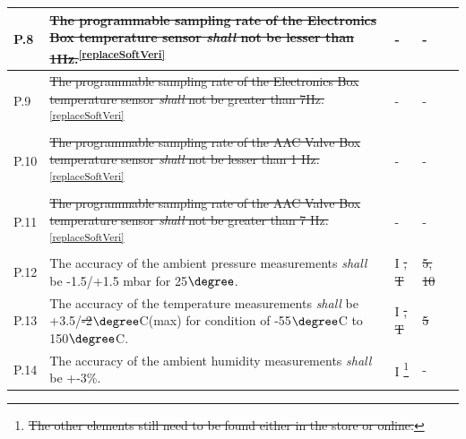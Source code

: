 \documentclass[a4paper,12pt,twoside, final]{article}
\providecommand{\DIFaddtex}[1]{{\protect\color{blue}\uwave{#1}}} %
\providecommand{\DIFdeltex}[1]{{\protect\color{red}\sout{#1}}}                      %
\providecommand{\DIFaddbegin}{} %
\providecommand{\DIFaddend}{} %
\providecommand{\DIFdelbegin}{} %
\providecommand{\DIFdelend}{} %
\providecommand{\DIFadd}[1]{\texorpdfstring{\DIFaddtex{#1}}{#1}} %
\providecommand{\DIFdel}[1]{\texorpdfstring{\DIFdeltex{#1}}{}} %
\newcommand{\DIFscaledelfig}{0.5}
\newlength{\DIFdelgraphicswidth} %
\newlength{\DIFdelgraphicsheight} %
\newcommand{\DIFaddincludegraphics}[2][]{{\color{blue}\fbox{\DIFOincludegraphics[#1]{#2}}}} %
\newcommand{\DIFdelincludegraphics}[2][]{%
\sbox{\DIFdelgraphicsbox}{\DIFOincludegraphics[#1]{#2}}%
\settoboxwidth{\DIFdelgraphicswidth}{\DIFdelgraphicsbox} %
\settoboxtotalheight{\DIFdelgraphicsheight}{\DIFdelgraphicsbox} %
\scalebox{\DIFscaledelfig}{%
\parbox[b]{\DIFdelgraphicswidth}{\usebox{\DIFdelgraphicsbox}\\[-\baselineskip] \rule{\DIFdelgraphicswidth}{0em}}\llap{\resizebox{\DIFdelgraphicswidth}{\DIFdelgraphicsheight}{%
\setlength{\unitlength}{\DIFdelgraphicswidth}%
\begin{picture}(1,1)%
\thicklines\linethickness{2pt} %
{\color[rgb]{1,0,0}\put(0,0){\framebox(1,1){}}}%
{\color[rgb]{1,0,0}\put(0,0){\line( 1,1){1}}}%
{\color[rgb]{1,0,0}\put(0,1){\line(1,-1){1}}}%
\end{picture}%
}\hspace*{3pt}}} %
} %
\DeclareRobustCommand{\DIFaddbegin}{\DIFOaddbegin \let\includegraphics\DIFaddincludegraphics} %
\DeclareRobustCommand{\DIFaddend}{\DIFOaddend \let\includegraphics\DIFOincludegraphics} %
\DeclareRobustCommand{\DIFdelbegin}{\DIFOdelbegin \let\includegraphics\DIFdelincludegraphics} %
\DeclareRobustCommand{\DIFdelend}{\DIFOaddend \let\includegraphics\DIFOincludegraphics} %
\begin{document}
\begin{longtable}[]{|m{}| m{} |m{} |m{}|m{}|}
P.8  & \st{The programmable sampling rate of the Electronics Box temperature sensor \textit{shall} not be lesser than 1Hz.}\textsuperscript{\ref{replaceSoftVeri}}                                                                          &       -       & -            &        \\ \hline
P.9  & \st{The programmable sampling rate of the Electronics Box temperature sensor \textit{shall} not be greater than 7Hz. }\textsuperscript{\ref{replaceSoftVeri}}                                                                        &        -    & -        &        \\ \hline
P.10 & \st{The programmable sampling rate of the AAC Valve Box temperature sensor \textit{shall} not be lesser than 1 Hz. }\textsuperscript{\ref{replaceSoftVeri}}                                                                  & -    & -        &        \\ \hline
P.11 & \st{The programmable sampling rate of the AAC Valve Box temperature sensor \textit{shall} not be greater than 7 Hz. }\textsuperscript{\ref{replaceSoftVeri}}                                                                 &  -    &   -      &        \\ \hline
P.12 & The accuracy of the ambient pressure measurements \textit{shall} be -1.5/+1.5 mbar for 25$\degree$.                                                                              &        I      \DIFdelbegin \DIFdel{, T      }\DIFdelend &  \DIFdelbegin \DIFdel{5, 10           }\DIFdelend \DIFaddbegin \DIFadd{-          }\DIFaddend & \DIFaddbegin \DIFadd{Pass       }\DIFaddend \\ \hline
P.13 & The accuracy of the temperature measurements \textit{shall} be +3.5/\DIFdelbegin \DIFdel{-2}\DIFdelend \DIFaddbegin \DIFadd{-3}\DIFaddend $\degree$C(max) for condition of -55$\degree$C to 150$\degree$C.                                   &       I       \DIFdelbegin \DIFdel{, T       }\DIFdelend & \DIFdelbegin \DIFdel{5            }\DIFdelend \DIFaddbegin \DIFadd{-            }\DIFaddend &    \DIFaddbegin \DIFadd{Pass    }\DIFaddend \\ \hline
P.14 & The accuracy of the ambient humidity measurements \textit{shall} be +-3\%.                                                                                                         &       I         \DIFdelbegin \footnote{\DIFdel{The other elements still need to be found either in the store or online. }%
}        %
\addtocounter{footnote}{-1}%
\DIFdelend &  -           & \DIFaddbegin \DIFadd{Pass        }\DIFaddend \\ \hline

\end{longtable}
\end{document}
